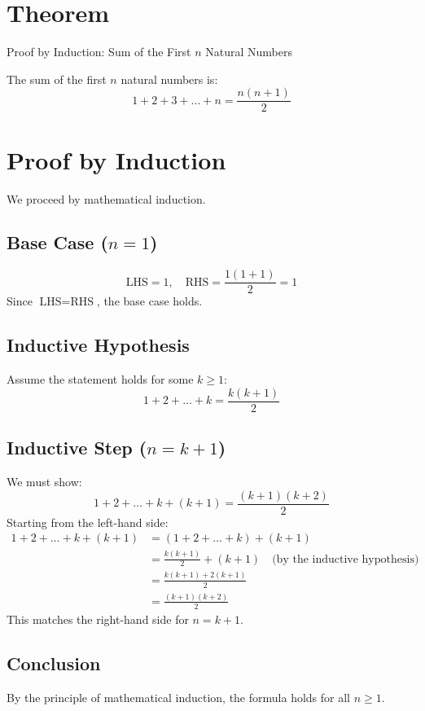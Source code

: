 \documentclass{article}
\begin{document}
\section{Theorem}
Proof by Induction: Sum of the First \( n \) Natural Numbers

The sum of the first \( n \) natural numbers is:
\[
    1 + 2 + 3 + \dots + n = \frac{n(n+1)}{2}
\]

\section{Proof by Induction}
We proceed by mathematical induction.

\subsection{Base Case (\( n = 1 \))}
\[
    \text{LHS} = 1, \quad \text{RHS} = \frac{1(1+1)}{2} = 1
\]
Since \(\text{LHS} = \text{RHS}\), the base case holds.

\subsection{Inductive Hypothesis}
Assume the statement holds for some \( k \geq 1 \):
\[
    1 + 2 + \dots + k = \frac{k(k+1)}{2}
\]

\subsection{Inductive Step (\( n = k + 1 \))}
We must show:
\[
    1 + 2 + \dots + k + (k+1) = \frac{(k+1)(k+2)}{2}
\]
Starting from the left-hand side:
\begin{align}
    1 + 2 + \dots + k + (k+1) & = \left(1 + 2 + \dots + k\right) + (k+1)                              \\
                              & = \frac{k(k+1)}{2} + (k+1) \quad \text{(by the inductive hypothesis)} \\
                              & = \frac{k(k+1) + 2(k+1)}{2}                                           \\
                              & = \frac{(k+1)(k + 2)}{2}
\end{align}
This matches the right-hand side for \( n = k+1 \).

\subsection{Conclusion}
By the principle of mathematical induction, the formula holds for all \( n \geq 1 \).
\end{document}
